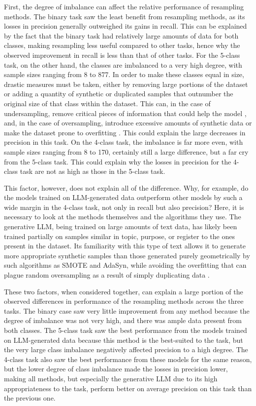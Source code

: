 \documentclass[runningheads]{llncs}
\begin{document}
First, the degree of imbalance can affect the relative performance of resampling methods. The binary task saw the least benefit from resampling methods, as its losses in precision generally outweighed its gains in recall. This can be explained by the fact that the binary task had relatively large amounts of data for both classes, making resampling less useful compared to other tasks, hence why the observed improvement in recall is less than that of other tasks. For the 5-class task, on the other hand, the classes are imbalanced to a very high degree, with sample sizes ranging from 8 to 877. In order to make these classes equal in size, drastic measures must be taken, either by removing large portions of the dataset or adding a quantity of synthetic or duplicated samples that outnumber the original size of that class within the dataset. This can, in the case of undersampling, remove critical pieces of information that could help the model \cite{marques} \cite{kraiem}, and, in the case of oversampling, introduce excessive amounts of synthetic data or make the dataset prone to overfitting \cite{marques} \cite{kraiem}. This could explain the large decreases in precision in this task. On the 4-class task, the imbalance is far more even, with sample sizes ranging from 8 to 170, certainly still a large difference, but a far cry from the 5-class task. This could explain why the losses in precision for the 4-class task are not as high as those in the 5-class task.

This factor, however, does not explain all of the difference. Why, for example, do the models trained on LLM-generated data outperform other models by such a wide margin in the 4-class task, not only in recall but also precision? Here, it is necessary to look at the methods themselves and the algorithms they use. The generative LLM, being trained on large amounts of text data, has likely been trained partially on samples similar in topic, purpose, or register to the ones present in the dataset. Its familiarity with this type of text allows it to generate more appropriate synthetic samples than those generated purely geometrically by such algorithms as SMOTE and AdaSyn, while avoiding the overfitting that can plague random oversampling as a result of simply duplicating data \cite{marques} \cite{kraiem}.

These two factors, when considered together, can explain a large portion of the observed differences in performance of the resampling methods across the three tasks. The binary case saw very little improvement from any method because the degree of imbalance was not very high, and there was ample data present from both classes. The 5-class task saw the best performance from the models trained on LLM-generated data because this method is the best-suited to the task, but the very large class imbalance negatively affected precision to a high degree. The 4-class task also saw the best performance from these models for the same reason, but the lower degree of class imbalance made the losses in precision lower, making all methods, but especially the generative LLM due to its high appropriateness to the task, perform better on average precision on this task than the previous one.
\end{document}
